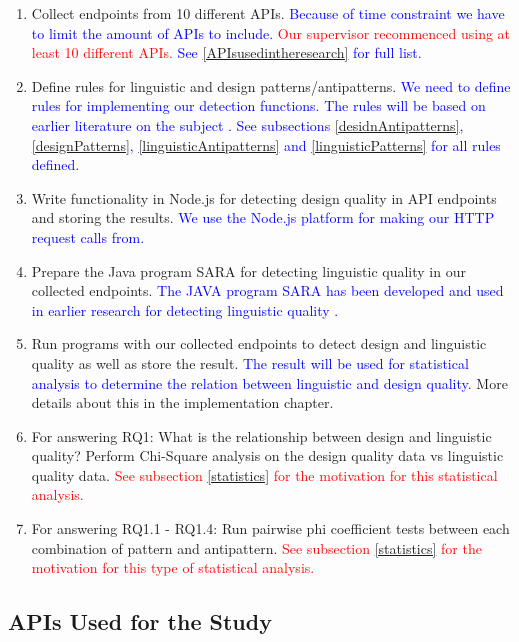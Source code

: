 \begin{enumerate}
    \item Collect endpoints from 10 different APIs. \textcolor{blue}{Because of time constraint we have to limit the amount of APIs to include. \textcolor{red}{Our supervisor recommenced using at least 10 different APIs.} See \ref{APIsusedintheresearch} for full list.}
    \item Define rules for linguistic and design patterns/antipatterns. \textcolor{blue}{ We need to define rules for implementing our detection functions. The rules will be based on earlier literature on the subject \cite{design} \cite{linguistic}. See subsections \ref{desidnAntipatterns}, \ref{designPatterns}, \ref{linguisticAntipatterns} and \ref{linguisticPatterns} for all rules defined.}
    \item Write functionality in Node.js for detecting design quality in API endpoints and storing the results. \textcolor{blue}{We use the Node.js platform for making our HTTP request calls from.}
    \item Prepare the Java program SARA for detecting linguistic quality in our collected endpoints. \textcolor{blue}{The JAVA program SARA has been developed and used in earlier research for detecting linguistic quality \cite{linguistic}.}
        \item Run programs with our collected endpoints to detect design and linguistic quality as well as store the result. \textcolor{blue}{The result will be used for statistical analysis to determine the relation between linguistic and design quality.} More details about this in the implementation chapter. 
    \item For answering RQ1: What is the relationship between design and linguistic quality? Perform Chi-Square analysis on the design quality data vs linguistic quality data. \textcolor{red}{See subsection \ref{statistics} for the motivation for this statistical analysis. }
        \item For answering RQ1.1 - RQ1.4: Run pairwise phi coefficient tests between each combination of pattern and antipattern. \textcolor{red}{See subsection \ref{statistics} for the motivation for this type of statistical analysis. }
\end{enumerate}

\subsection{APIs Used for the Study} \label{selectedAPIs}

